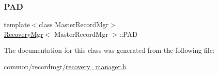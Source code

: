 \mbox{\label{classRecoveryMgr_aa18a397143e99c8e72d175f3c9562c9e}} 
\subsubsection{\texorpdfstring{P\+AD}{PAD}}
{\footnotesize\ttfamily template$<$class Master\+Record\+Mgr$>$ \\
\hyperlink{classRecoveryMgr}{Recovery\+Mgr}$<$ Master\+Record\+Mgr $>$\+::P\+AD}



The documentation for this class was generated from the following file\+:\begin{DoxyCompactItemize}
\item 
common/recordmgr/\hyperlink{recovery__manager_8h}{recovery\+\_\+manager.\+h}\end{DoxyCompactItemize}
